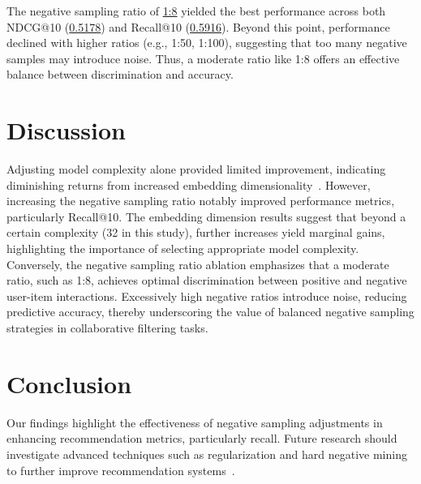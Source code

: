 \documentclass[runningheads]{llncs}
\begin{document}
The negative sampling ratio of \underline{1:8} yielded the best performance across both NDCG@10 (\underline{0.5178}) and Recall@10 (\underline{0.5916}). Beyond this point, performance declined with higher ratios (e.g., 1:50, 1:100), suggesting that too many negative samples may introduce noise. Thus, a moderate ratio like 1:8 offers an effective balance between discrimination and accuracy.

\section{Discussion}
Adjusting model complexity alone provided limited improvement, indicating diminishing returns from increased embedding dimensionality~\cite{he2017neural}. However, increasing the negative sampling ratio notably improved performance metrics, particularly Recall@10. The embedding dimension results suggest that beyond a certain complexity (32 in this study), further increases yield marginal gains, highlighting the importance of selecting appropriate model complexity. Conversely, the negative sampling ratio ablation emphasizes that a moderate ratio, such as 1:8, achieves optimal discrimination between positive and negative user-item interactions. Excessively high negative ratios introduce noise, reducing predictive accuracy, thereby underscoring the value of balanced negative sampling strategies in collaborative filtering tasks.

\section{Conclusion}
Our findings highlight the effectiveness of negative sampling adjustments in enhancing recommendation metrics, particularly recall. Future research should investigate advanced techniques such as regularization and hard negative mining to further improve recommendation systems~\cite{rendle2012bpr}.



\appendix
\end{document}
